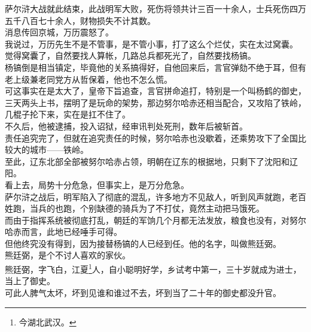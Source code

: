 \begin{multicols}{\theparacolNo}
萨尔浒大战就此结束，此战明军大败，死伤将领共计三百一十余人，士兵死伤四万五千八百七十余人，财物损失不计其数。\\

消息传回京城，万历震怒了。\\

我说过，万历先生不是不管事，是不管小事，打了这么个烂仗，实在太过窝囊。\\

觉得窝囊了，自然要找人算帐，几路总兵都死光了，自然要找杨镐。\\

杨镐倒是相当镇定，毕竟他的关系搞得好，自他回来后，言官弹劾不绝于耳，但有老上级兼老同党方从哲保着，他也不怎么慌。\\

可这事实在是太大了，皇帝下旨追查，言官拼命追打，特别是一个叫杨鹤的御史，三天两头上书，摆明了是玩命的架势，那边努尔哈赤还相当配合，又攻陷了铁岭，几棍子抡下来，实在是扛不住了。\\

不久后，他被逮捕，投入诏狱，经审讯判处死刑，数年后被斩首。\\

责任追究完了，但就在追究责任的时候，努尔哈赤也没歇着，还乘势攻下了全国比较大的城市——铁岭。\\

至此，辽东北部全部被努尔哈赤占领，明朝在辽东的根据地，只剩下了沈阳和辽阳。\\

看上去，局势十分危急，但事实上，是万分危急。\\

萨尔浒之战后，明军陷入了彻底的混乱，许多地方不见敌人，听到风声就跑，老百姓跑，当兵的也跑，个别缺德的骑兵为了不打仗，竟然主动把马饿死。\\

而由于指挥系统被彻底打乱，朝廷的军饷几个月都无法发放，粮食也没有，对努尔哈赤而言，此地已经唾手可得。\\

但他终究没有得到，因为接替杨镐的人已经到任。他的名字，叫做熊廷弼。\\

熊廷弼，是个不讨人喜欢的家伙。\\

熊廷弼，字飞白，江夏\footnote{今湖北武汉。}人，自小聪明好学，乡试考中第一，三十岁就成为进士，当上了御史。\\

可此人脾气太坏，坏到见谁和谁过不去，坏到当了二十年的御史都没升官。\\


\end{multicols}
